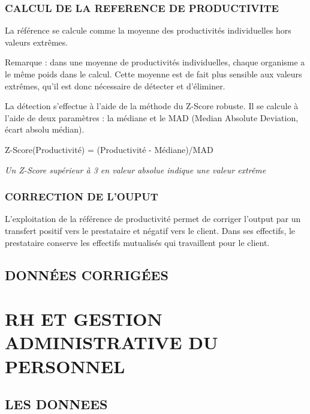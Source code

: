 \documentclass[
]{book}
\begin{document}
\hypertarget{calcul-de-la-reference-de-productivite-3}{%
\subsection{CALCUL DE LA REFERENCE DE PRODUCTIVITE}\label{calcul-de-la-reference-de-productivite-3}}

La référence se calcule comme la moyenne des productivités individuelles hors valeurs extrêmes.

Remarque : dans une moyenne de productivités individuelles, chaque organisme a le même poids dans le calcul. Cette moyenne est de fait plus sensible aux valeurs extrêmes, qu'il est donc nécessaire de détecter et d'éliminer.

La détection s'effectue à l'aide de la méthode du Z-Score robuste.
Il se calcule à l'aide de deux paramètres : la médiane et le MAD (Median Absolute Deviation, écart absolu médian).

Z-Score(Productivité) = (Productivité - Médiane)/MAD

\emph{Un Z-Score supérieur à 3 en valeur absolue indique une valeur extrême}

\hypertarget{correction-de-louput-3}{%
\subsection{CORRECTION DE L'OUPUT}\label{correction-de-louput-3}}

L'exploitation de la référence de productivité permet de corriger l'output par un transfert positif vers le prestataire et négatif vers le client.
Dans ses effectifs, le prestataire conserve les effectifs mutualisés qui travaillent pour le client.

\hypertarget{donnuxe9es-corriguxe9es-3}{%
\section{DONNÉES CORRIGÉES}\label{donnuxe9es-corriguxe9es-3}}

\hypertarget{rh-et-gestion-administrative-du-personnel}{%
\chapter{RH ET GESTION ADMINISTRATIVE DU PERSONNEL}\label{rh-et-gestion-administrative-du-personnel}}

\hypertarget{les-donnees-15}{%
\section{LES DONNEES}\label{les-donnees-15}}
\end{document}
